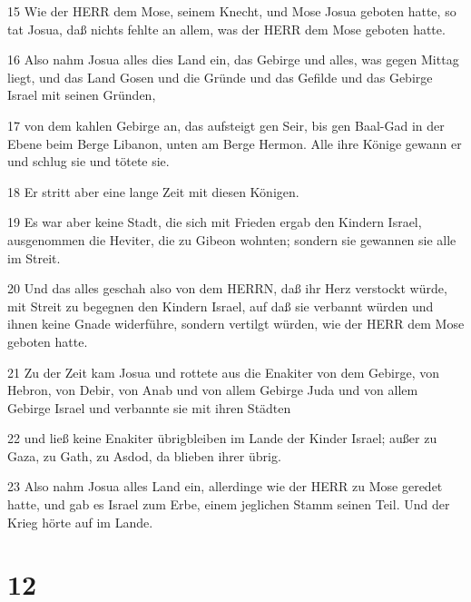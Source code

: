 \par 15 Wie der HERR dem Mose, seinem Knecht, und Mose Josua geboten hatte, so tat Josua, daß nichts fehlte an allem, was der HERR dem Mose geboten hatte.
\par 16 Also nahm Josua alles dies Land ein, das Gebirge und alles, was gegen Mittag liegt, und das Land Gosen und die Gründe und das Gefilde und das Gebirge Israel mit seinen Gründen,
\par 17 von dem kahlen Gebirge an, das aufsteigt gen Seir, bis gen Baal-Gad in der Ebene beim Berge Libanon, unten am Berge Hermon. Alle ihre Könige gewann er und schlug sie und tötete sie.
\par 18 Er stritt aber eine lange Zeit mit diesen Königen.
\par 19 Es war aber keine Stadt, die sich mit Frieden ergab den Kindern Israel, ausgenommen die Heviter, die zu Gibeon wohnten; sondern sie gewannen sie alle im Streit.
\par 20 Und das alles geschah also von dem HERRN, daß ihr Herz verstockt würde, mit Streit zu begegnen den Kindern Israel, auf daß sie verbannt würden und ihnen keine Gnade widerführe, sondern vertilgt würden, wie der HERR dem Mose geboten hatte.
\par 21 Zu der Zeit kam Josua und rottete aus die Enakiter von dem Gebirge, von Hebron, von Debir, von Anab und von allem Gebirge Juda und von allem Gebirge Israel und verbannte sie mit ihren Städten
\par 22 und ließ keine Enakiter übrigbleiben im Lande der Kinder Israel; außer zu Gaza, zu Gath, zu Asdod, da blieben ihrer übrig.
\par 23 Also nahm Josua alles Land ein, allerdinge wie der HERR zu Mose geredet hatte, und gab es Israel zum Erbe, einem jeglichen Stamm seinen Teil. Und der Krieg hörte auf im Lande.

\chapter{12}


